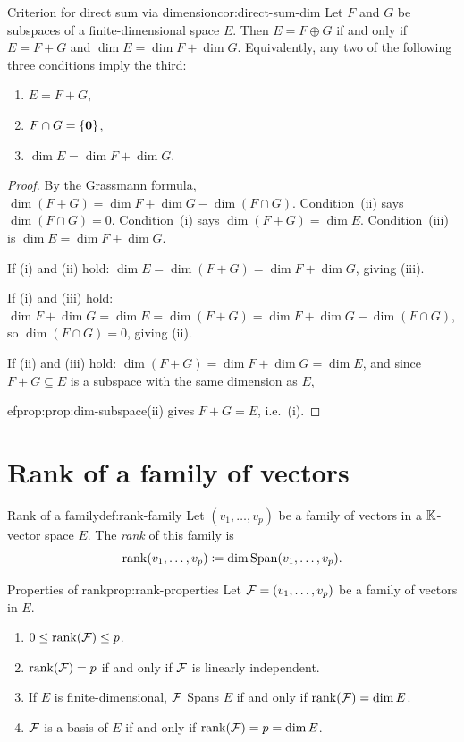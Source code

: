 \begin{corollary}{Criterion for direct sum via dimension}{cor:direct-sum-dim}
Let $F$ and $G$ be subspaces of a finite-dimensional space $E$. Then
$E = F\oplus G$ if and only if $E = F+G$ and $\dim E = \dim F+\dim G$.
Equivalently, any two of the following three conditions imply the third:
\begin{enumerate}[label=(\roman*)]
  \item $E = F+G$,
  \item $F\cap G = \left\{\mathbf{0}\right\}$,
  \item $\dim E = \dim F + \dim G$.
\end{enumerate}
\end{corollary}

\begin{proof}
By the Grassmann formula, $\dim(F+G) = \dim F + \dim G - \dim(F\cap G)$.
Condition~(ii) says $\dim(F\cap G)=0$. Condition~(i) says
$\dim(F+G)=\dim E$. Condition~(iii) is
$\dim E = \dim F + \dim G$.

If (i) and (ii) hold: $\dim E = \dim(F+G) = \dim F+\dim G$, giving (iii).

If (i) and (iii) hold: $\dim F+\dim G = \dim E = \dim(F+G) =
\dim F+\dim G-\dim(F\cap G)$, so $\dim(F\cap G)=0$, giving (ii).

If (ii) and (iii) hold: $\dim(F+G) = \dim F+\dim G = \dim E$, and since
$F+G\subseteq E$ is a subspace with the same dimension as $E$,

ef{prop:prop:dim-subspace}(ii) gives $F+G=E$, i.e.\ (i).
\end{proof}


\section{Rank of a family of vectors}\label{sec:rank}

\begin{definition}{Rank of a family}{def:rank-family}
Let $(v_1,\ldots,v_p)$ be a family of vectors in a ${\mathbb{K}}$-vector space
$E$. The \emph{rank} of this family is
\[
  \operatorname{rank}(v_1,\ldots,v_p) \coloneqq \dim\operatorname{Span}(v_1,\ldots,v_p).
\]
\end{definition}

\begin{proposition}{Properties of rank}{prop:rank-properties}
Let ${\mathcal{F}} = (v_1,\ldots,v_p)$ be a family of vectors in $E$.
\begin{enumerate}[label=(\roman*)]
  \item $0\leq\operatorname{rank}({\mathcal{F}})\leq p$.
  \item $\operatorname{rank}({\mathcal{F}}) = p$ if and only if ${\mathcal{F}}$ is linearly independent.
  \item If $E$ is finite-dimensional, ${\mathcal{F}}$ Spans $E$ if and only if
    $\operatorname{rank}({\mathcal{F}}) = \dim E$.
  \item ${\mathcal{F}}$ is a basis of $E$ if and only if
    $\operatorname{rank}({\mathcal{F}}) = p = \dim E$.
\end{enumerate}
\end{proposition}


